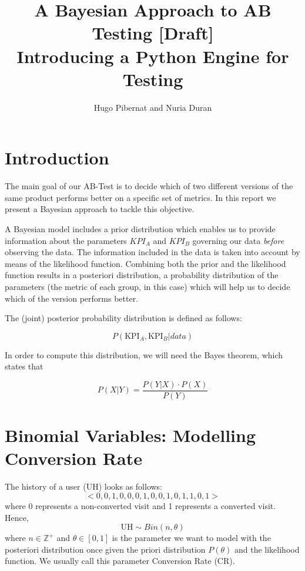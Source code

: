 \documentclass[11pt, a4wide]{article}   	%
\title{A Bayesian Approach to AB Testing [Draft]\\{\small Introducing a Python Engine for Testing}}
\author{Hugo Pibernat and Nuria Duran}
\newcommand{\ushi}{\text{UH}}
\begin{document}
\maketitle
\section{Introduction}
The main goal of our AB-Test is to decide which of two different versions of the same product performs better on a specific set of metrics. In this report we present a Bayesian approach to tackle this objective.

A Bayesian model includes a prior distribution which enables us to provide information about the parameters $KPI_A$ and $KPI_B$ governing our data \emph{before} observing the data. The information included in the data is taken into account by means of the likelihood function. Combining both the prior and the likelihood function results in a posteriori distribution, a probability distribution of the parameters (the metric of each group, in this case) which will help us to decide which of the version performs better.

The (joint) posterior probability distribution is defined as follows:


\begin{equation}
P(\text{KPI}_A,\text{KPI}_B|data)
\end{equation}

In order to compute this distribution, we will need the Bayes theorem, which states that

\begin{equation}
P(X|Y) = \frac{P(Y|X)\cdot P(X)}{P(Y)}
\end{equation}

\section{Binomial Variables: Modelling Conversion Rate}

The history of a user (UH) looks as follows:
\begin{equation}
<0,0,1,0,0,0,1,0,0,1,0,1,1,0,1>
\end{equation}
where 0 represents a non-converted visit and 1 represents a converted visit. Hence, 
\begin{equation}
\ushi\sim Bin(n,\theta)
\end{equation}
where $n\in \mathbb{Z}^{+}$ and $\theta\in[0,1]$ is the parameter we want to model with the posteriori distribution once given the priori distribution $P(\theta)$ and the likelihood function. We usually call this parameter Conversion Rate (CR).
\end{document}
